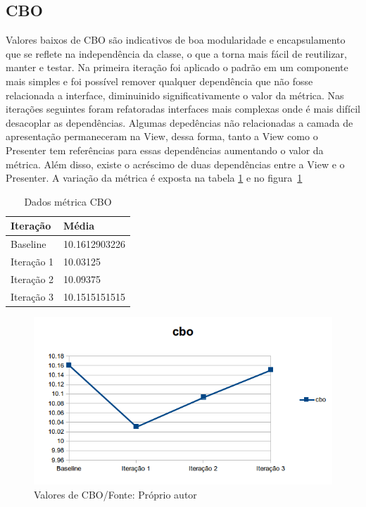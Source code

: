 
\subsection{CBO}

Valores baixos de CBO são indicativos de boa modularidade e encapsulamento que
se reflete na independência da classe, o que a torna mais fácil de reutilizar,
manter e testar.
Na primeira iteração foi aplicado o padrão em um componente mais simples e foi
possível remover qualquer dependência que não fosse relacionada a interface,
diminuinido significativamente o valor da métrica. Nas iterações seguintes foram
refatoradas interfaces mais complexas onde é mais difícil desacoplar as
dependências. Algumas depedências não relacionadas a camada de apresentação
permaneceram na View, dessa forma, tanto a View como o Presenter tem referências
para essas dependências aumentando o valor da métrica. Além disso, existe o
acréscimo de duas dependências entre a View e o Presenter. A variação da métrica
é exposta na tabela \ref{tab:cbo} e no figura~\ref{fig:cbo}

\begin{table}[h]
	\centering
	    \caption{Dados métrica CBO}
	
    \begin{tabular}{ | l | l | }
    \hline
    Iteração & Média 			\\ \hline
    Baseline & 10.1612903226   	\\ \hline
    Iteração 1 & 10.03125		\\ \hline
	Iteração 2 & 10.09375		\\ \hline
	Iteração 3 & 10.1515151515	\\ \hline
    \end{tabular}
    \label{tab:cbo}
\end{table}

\begin{figure}[h]
	\centering
	\includegraphics{img/cbo.png}
	\caption{Valores de CBO/Fonte: Próprio autor}
	\label{fig:cbo}
\end{figure}


